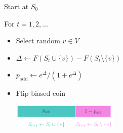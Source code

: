 \documentclass[varwidth]{standalone}
\begin{document}
\color{textcolor}

Start at $S_0$

\vspace{0.7em}
For $t = 1, 2, \ldots$
\vspace{0.4em}
\begin{itemize}
\item Select random $v \in V$
\vspace{0.4em}
\item $\Delta \gets F(S_t \cup \{v\}) - F(S_t \setminus \{v\})$
\vspace{0.4em}
\item $p_{\textrm{add}} \gets e^{\Delta} / \left(1 + e^{\Delta}\right)$
\vspace{0.4em}
\item Flip biased coin

\vspace{-1.5em}
\begin{minipage}{0.5\textwidth}\vspace{2em}\includegraphics[width=2in]{gibbs.pdf}\end{minipage}
\end{itemize}
\end{document}
